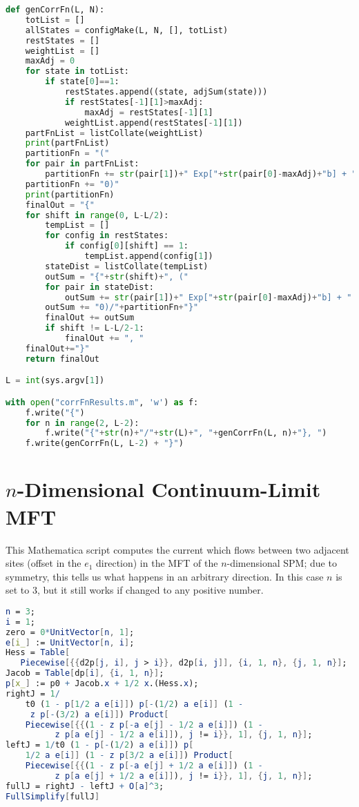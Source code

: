 \begin{lstlisting}[language=Python]
def genCorrFn(L, N):
    totList = []
    allStates = configMake(L, N, [], totList)
    restStates = []
    weightList = []
    maxAdj = 0
    for state in totList:
        if state[0]==1:
            restStates.append((state, adjSum(state)))
            if restStates[-1][1]>maxAdj:
                maxAdj = restStates[-1][1]
            weightList.append(restStates[-1][1])
    partFnList = listCollate(weightList)
    print(partFnList)
    partitionFn = "("
    for pair in partFnList:
        partitionFn += str(pair[1])+" Exp["+str(pair[0]-maxAdj)+"b] + "
    partitionFn += "0)"
    print(partitionFn)
    finalOut = "{"
    for shift in range(0, L-L/2):
        tempList = []
        for config in restStates:
            if config[0][shift] == 1:
                tempList.append(config[1])
        stateDist = listCollate(tempList)
        outSum = "{"+str(shift)+", ("
        for pair in stateDist:
            outSum += str(pair[1])+" Exp["+str(pair[0]-maxAdj)+"b] + "
        outSum += "0)/"+partitionFn+"}"
        finalOut += outSum
        if shift != L-L/2-1:
            finalOut += ", "
    finalOut+="}"
    return finalOut

L = int(sys.argv[1])

with open("corrFnResults.m", 'w') as f:
    f.write("{")
    for n in range(2, L-2):
        f.write("{"+str(n)+"/"+str(L)+", "+genCorrFn(L, n)+"}, ")
    f.write(genCorrFn(L, L-2) + "}")
\end{lstlisting}

\section{$n$-Dimensional Continuum-Limit MFT \label{sec:mftCode}}

This Mathematica script computes the current which flows between two adjacent sites
(offset in the $e_1$ direction) in the MFT of the $n$-dimensional SPM; due to symmetry, this tells us
what happens in an arbitrary direction. In this case $n$ is set to $3$,
but it still works if changed to any positive number.

\begin{lstlisting}[language=Mathematica]
n = 3;
i = 1;
zero = 0*UnitVector[n, 1];
e[i_] := UnitVector[n, i];
Hess = Table[
   Piecewise[{{d2p[j, i], j > i}}, d2p[i, j]], {i, 1, n}, {j, 1, n}];
Jacob = Table[dp[i], {i, 1, n}];
p[x_] := p0 + Jacob.x + 1/2 x.(Hess.x);
rightJ = 1/
    t0 (1 - p[1/2 a e[i]]) p[-(1/2) a e[i]] (1 - 
     z p[-(3/2) a e[i]]) Product[
    Piecewise[{{(1 - z p[-a e[j] - 1/2 a e[i]]) (1 - 
          z p[a e[j] - 1/2 a e[i]]), j != i}}, 1], {j, 1, n}];
leftJ = 1/t0 (1 - p[-(1/2) a e[i]]) p[
    1/2 a e[i]] (1 - z p[3/2 a e[i]]) Product[
    Piecewise[{{(1 - z p[-a e[j] + 1/2 a e[i]]) (1 - 
          z p[a e[j] + 1/2 a e[i]]), j != i}}, 1], {j, 1, n}];
fullJ = rightJ - leftJ + O[a]^3;
FullSimplify[fullJ]
\end{lstlisting}


